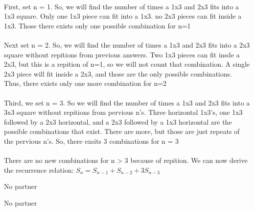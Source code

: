 \documentclass[11pt]{article}
\begin{document}
\begin{solution}
\\   First,  set n = 1. So, we will find the number of times a 1x3 and 2x3 fits
into a 1x3 square. Only one 1x3 piece can fit into a 1x3. no 2x3 pieces can fit
inside a 1x3. Those there exists only one possible combination for n=1
\\
\\   Next set n = 2. So, we will find the number of times a 1x3 and 2x3 fits
into a 2x3 square without repitions from previous answers.  Two 1x3 pieces can fit
insde a 2x3, but this is a repition of n=1, so we will not count that combination.
A single 2x3 piece will fit inside a 2x3, and those are the only possible combinations.
Thus, there exists only one more combination for n=2
\\
\\   Third, we set n = 3. So we will find the number of times a 1x3 and 2x3 fits
into a 3x3 square without repitions from pervious n's. Three horizontal 1x3's,
one 1x3 followed by a 2x3 horizontal, and a 2x3 followed by a 1x3 horizontal are
the possible combinations that exist.  There are more, but those are just repeats
of the pervious n's. So, there exsits 3 combinations for n = 3
\\
\\   There are no new combinations for n > 3 because of repition. We can now
derive the recurrence relation: $S_{n} = S_{n-1} + S_{n-2} + 3S_{n-3}$
\end{solution}


\begin{problem}
    No partner
\end{problem}


\begin{solution}
    No partner
\end{solution}
\end{document}
